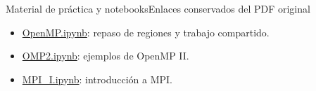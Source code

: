 \documentclass[aspectratio=169,10pt]{beamer}
\begin{document}
\begin{frame}[fragile]{Material de práctica y notebooks}{Enlaces conservados del PDF original}
\begin{itemize}[<+->]\setlength\itemsep{7pt}
\item \href{https://github.com/adigenova/uohpmd/blob/main/code/OpenMP.ipynb}{OpenMP.ipynb}: repaso de regiones y trabajo compartido.
\item \href{https://github.com/adigenova/uohpmd/blob/main/code/OMP2.ipynb}{OMP2.ipynb}: ejemplos de OpenMP II.
\item \href{https://github.com/adigenova/uohpmd/blob/main/code/MPI_I.ipynb}{MPI\_I.ipynb}: introducción a MPI.
\end{itemize}
\end{frame}
\end{document}
